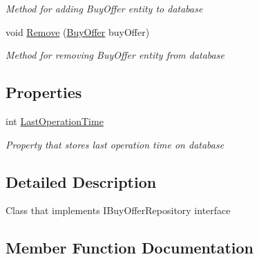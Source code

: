 \begin{DoxyCompactItemize}
\begin{DoxyCompactList}\small\item\em Method for adding Buy\+Offer entity to database \end{DoxyCompactList}\item 
void \mbox{\hyperlink{class_gielda_l2_1_1_i_n_f_r_a_s_t_r_u_c_t_u_r_e_1_1_repositories_1_1_buy_offer_repository_a14dec5a8063f5d8b6a106f65fc6ec293}{Remove}} (\mbox{\hyperlink{class_gielda_l2_1_1_d_b_1_1_entities_1_1_buy_offer}{Buy\+Offer}} buy\+Offer)
\begin{DoxyCompactList}\small\item\em Method for removing Buy\+Offer entity from database \end{DoxyCompactList}\end{DoxyCompactItemize}
\subsection*{Properties}
\begin{DoxyCompactItemize}
\item 
int \mbox{\hyperlink{class_gielda_l2_1_1_i_n_f_r_a_s_t_r_u_c_t_u_r_e_1_1_repositories_1_1_buy_offer_repository_aa2fa49c9bc8775391160b85ea09d0cda}{Last\+Operation\+Time}}
\begin{DoxyCompactList}\small\item\em Property that stores last operation time on database \end{DoxyCompactList}\end{DoxyCompactItemize}


\subsection{Detailed Description}
Class that implements I\+Buy\+Offer\+Repository interface 



\subsection{Member Function Documentation}
\mbox{\label{class_gielda_l2_1_1_i_n_f_r_a_s_t_r_u_c_t_u_r_e_1_1_repositories_1_1_buy_offer_repository_aeffc5aeab22da20ecaa887219079c5a1}} 
